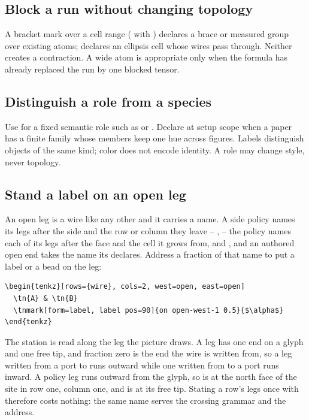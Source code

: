 \subsection{Block a run without changing topology}

A bracket mark over a cell range ( with
) declares a brace or measured group over existing
atoms;  declares an ellipsis cell whose wires pass
through.  Neither creates a contraction.  A wide atom is appropriate only
when the formula has already replaced the run by one blocked tensor.

\subsection{Distinguish a role from a species}

Use  for a fixed semantic role such as  or
.  Declare  at setup scope when a paper has a
finite family whose members keep one hue across figures.  Labels distinguish
objects of the same kind; color does not encode identity.  A role may change
style, never topology.

\subsection{Stand a label on an open leg}

An open leg is a wire like any other and it carries a name.  A side policy
names its legs after the side and the row or column they leave --
,  -- the  policy
names each of its legs after the face and the cell it grows from,
 and , and an authored open end
takes the name its  declares.  Address a fraction of that name
to put a label or a bead on the leg:

\begin{Verbatim}[fontsize=\small,frame=leftline]
\begin{tenkz}[rows={wire}, cols=2, west=open, east=open]
  \tn{A} & \tn{B}
  \tnmark[form=label, label pos=90]{on open-west-1 0.5}{$\alpha$}
\end{tenkz}
\end{Verbatim}

The station is read along the leg the picture draws.  A leg has one end on a
glyph and one free tip, and fraction zero is the end the wire is written
from, so a leg written from a port to  runs outward while one
written from  to a port runs inward.  A policy leg runs outward
from the glyph, so  is at the north face of the site in
row one, column one, and  is at its free tip.  Stating a
row's legs once with  therefore costs nothing: the same name
serves the crossing grammar and the address.

